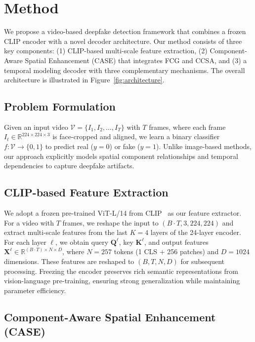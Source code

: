 \section{Method}
\label{sec:method}

We propose a video-based deepfake detection framework that combines a frozen CLIP encoder with a novel decoder architecture. Our method consists of three key components: (1) CLIP-based multi-scale feature extraction, (2) Component-Aware Spatial Enhancement (CASE) that integrates FCG and CCSA, and (3) a temporal modeling decoder with three complementary mechanisms. The overall architecture is illustrated in Figure~\ref{fig:architecture}.

\subsection{Problem Formulation}

Given an input video $\mathcal{V} = \{I_1, I_2, \ldots, I_T\}$ with $T$ frames, where each frame $I_t \in \mathbb{R}^{224 \times 224 \times 3}$ is face-cropped and aligned, we learn a binary classifier $f: \mathcal{V} \rightarrow \{0, 1\}$ to predict real ($y=0$) or fake ($y=1$). Unlike image-based methods, our approach explicitly models spatial component relationships and temporal dependencies to capture deepfake artifacts.

\subsection{CLIP-based Feature Extraction}

We adopt a frozen pre-trained ViT-L/14 from CLIP~\cite{radford2021learning} as our feature extractor. For a video with $T$ frames, we reshape the input to $(B \cdot T, 3, 224, 224)$ and extract multi-scale features from the last $K=4$ layers of the 24-layer encoder. For each layer $\ell$, we obtain query $\mathbf{Q}^\ell$, key $\mathbf{K}^\ell$, and output features $\mathbf{X}^\ell \in \mathbb{R}^{(B \cdot T) \times N \times D}$, where $N=257$ tokens (1 CLS + 256 patches) and $D=1024$ dimensions. These features are reshaped to $(B, T, N, D)$ for subsequent processing. Freezing the encoder preserves rich semantic representations from vision-language pre-training, ensuring strong generalization while maintaining parameter efficiency.

\subsection{Component-Aware Spatial Enhancement (CASE)}


